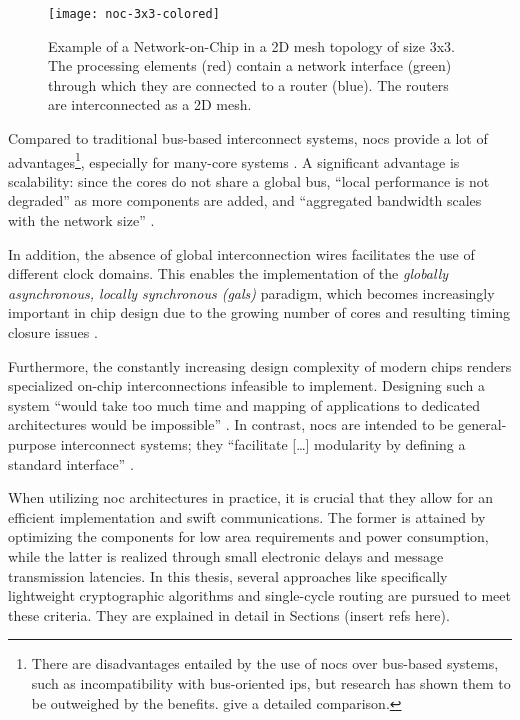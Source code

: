 \begin{figure}
    \centering
    \texttt{[image: noc-3x3-colored]}
    \caption[Example of a 3x3 mesh NoC]{Example of a Network-on-Chip in a 2D mesh topology of size 3x3. The processing elements (red) contain a network interface
    (green) through which they are connected to a router (blue). The routers are interconnected as a 2D mesh.}
    \label{fig:nocexample}
\end{figure}

Compared to traditional bus-based interconnect systems, \glspl{noc} provide a lot of advantages\footnote{There are disadvantages entailed by
the use of \glspl{noc} over bus-based systems, such as incompatibility with bus-oriented \glspl{ip}, but research has shown them to be outweighed
by the benefits. \citeauthor{tatas16designingnocs} \cite[6]{tatas16designingnocs} give a detailed comparison.}, especially for many-core systems
\cite[5\psqq]{tatas16designingnocs}. A significant advantage is scalability: since the cores do not share a global bus, \enquote{local performance is not
degraded} \cite[6]{tatas16designingnocs} as more components are added, and \enquote{aggregated bandwidth scales with the network size}
\cite[6]{tatas16designingnocs}.

In addition, the absence of global interconnection wires facilitates the use of different clock domains. This enables the implementation of the
\textit{globally asynchronous, locally synchronous (\gls{gals})} paradigm, which becomes increasingly important in chip design due to the growing
number of cores and resulting timing closure issues \cites[3]{kumar02networkonchip}[2]{ivanov05nocintroduction}.

Furthermore, the constantly increasing design complexity of modern chips \cite{mack11mooreslaw} renders specialized on-chip
interconnections infeasible to implement. Designing such a system \enquote{would take too much time and mapping of applications to dedicated
architectures would be impossible} \cite[1]{kumar02networkonchip}. In contrast, \glspl{noc} are intended to be general-purpose interconnect systems; they
\enquote{facilitate […] modularity by defining a standard interface} \cite[1]{dally01routepacketsnotwires}.

When utilizing \gls{noc} architectures in practice, it is crucial that they allow for an efficient implementation and swift communications. The
former is attained by optimizing the components for low area requirements and power consumption, while the latter is realized %
through small electronic delays and message transmission latencies. In this thesis, several approaches like specifically lightweight cryptographic
algorithms and single-cycle routing are pursued to meet these criteria. They are explained in detail in Sections (insert refs here).%

